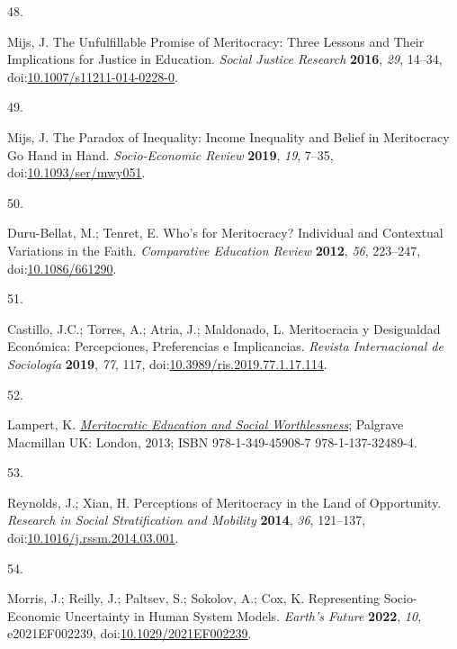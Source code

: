 \documentclass[
  12pt,
  letterpaper,
]{article}
\newlength{\cslhangindent}
\newlength{\csllabelwidth}
\newenvironment{CSLReferences}[2] %
 {\begin{list}{}{%
  \setlength{\itemindent}{0pt}
  \setlength{\leftmargin}{0pt}
  \setlength{\parsep}{0pt}
  \ifodd #1
   \setlength{\leftmargin}{\cslhangindent}
   \setlength{\itemindent}{-1\cslhangindent}
  \fi
  \setlength{\itemsep}{#2\baselineskip}}}
 {\end{list}}
\newcommand{\CSLLeftMargin}[1]{\parbox[t]{\csllabelwidth}{\strut#1\strut}}
\newcommand{\CSLRightInline}[1]{\parbox[t]{\linewidth - \csllabelwidth}{\strut#1\strut}}
\begin{document}
\begin{CSLReferences}{0}{0}
\CSLLeftMargin{48. }%
\CSLRightInline{Mijs, J. The {Unfulfillable Promise} of {Meritocracy}:
{Three Lessons} and {Their Implications} for {Justice} in {Education}.
\emph{Social Justice Research} \textbf{2016}, \emph{29}, 14--34,
doi:\href{https://doi.org/10.1007/s11211-014-0228-0}{10.1007/s11211-014-0228-0}.}

\CSLLeftMargin{49. }%
\CSLRightInline{Mijs, J. The Paradox of Inequality: Income Inequality
and Belief in Meritocracy Go Hand in Hand. \emph{Socio-Economic Review}
\textbf{2019}, \emph{19}, 7--35,
doi:\href{https://doi.org/10.1093/ser/mwy051}{10.1093/ser/mwy051}.}

\CSLLeftMargin{50. }%
\CSLRightInline{Duru-Bellat, M.; Tenret, E. Who's for {Meritocracy}?
{Individual} and {Contextual Variations} in the {Faith}.
\emph{Comparative Education Review} \textbf{2012}, \emph{56}, 223--247,
doi:\href{https://doi.org/10.1086/661290}{10.1086/661290}.}

\CSLLeftMargin{51. }%
\CSLRightInline{Castillo, J.C.; Torres, A.; Atria, J.; Maldonado, L.
Meritocracia y Desigualdad Econ{ó}mica: {Percepciones}, Preferencias e
Implicancias. \emph{Revista Internacional de Sociolog{í}a}
\textbf{2019}, \emph{77}, 117,
doi:\href{https://doi.org/10.3989/ris.2019.77.1.17.114}{10.3989/ris.2019.77.1.17.114}.}

\CSLLeftMargin{52. }%
\CSLRightInline{Lampert, K.
\emph{\href{https://doi.org/10.1057/9781137324894}{Meritocratic
{Education} and {Social Worthlessness}}}; Palgrave Macmillan UK: London,
2013; ISBN 978-1-349-45908-7 978-1-137-32489-4.}

\CSLLeftMargin{53. }%
\CSLRightInline{Reynolds, J.; Xian, H. Perceptions of Meritocracy in the
Land of Opportunity. \emph{Research in Social Stratification and
Mobility} \textbf{2014}, \emph{36}, 121--137,
doi:\href{https://doi.org/10.1016/j.rssm.2014.03.001}{10.1016/j.rssm.2014.03.001}.}

\CSLLeftMargin{54. }%
\CSLRightInline{Morris, J.; Reilly, J.; Paltsev, S.; Sokolov, A.; Cox,
K. Representing {Socio}-{Economic Uncertainty} in {Human System Models}.
\emph{Earth's Future} \textbf{2022}, \emph{10}, e2021EF002239,
doi:\href{https://doi.org/10.1029/2021EF002239}{10.1029/2021EF002239}.}


\end{CSLReferences}
\end{document}
